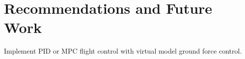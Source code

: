 \chapter{Recommendations and Future Work}

Implement PID or MPC flight control with virtual model ground force control.